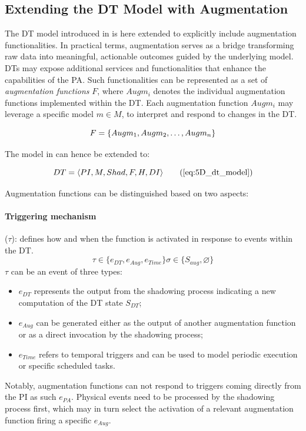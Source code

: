 \subsection{Extending the DT Model with Augmentation}

The \ac{DT} model introduced in  is here extended to explicitly include augmentation functionalities.
%
In practical terms, augmentation serves as a bridge transforming raw data into meaningful, actionable outcomes guided by the underlying model.
\acp{DT} may expose additional services and functionalities that enhance the capabilities of the \ac{PA}.
Such functionalities can be represented as a set of \emph{augmentation functions} $F$, where $Augm_{i}$ denotes the individual augmentation functions implemented within the DT. Each augmentation function $Augm_i$ may leverage a specific model $m \in M$, to interpret and respond to changes in the DT.

\begin{equation}\label{eq:augm_set}
    F = \{Augm_{1}, Augm_{2}, \dots, Augm_{n}\}\\
\end{equation}

The model in  can hence be extended to: 

\begin{equation}
DT = \langle PI, M, Shad, F, H, DI \rangle
\tag{\ref{eq:5D_dt_model}}
\end{equation}

Augmentation functions can be distinguished based on two aspects:


\paragraph{Triggering mechanism} (\( \tau \)): defines how and when the function is activated in response to events within the \ac{DT}.
%
\begin{equation}
\tau \in \{ e_{DT}, e_{Aug}, e_{Time} \}  \sigma \in \{S_{aug}, \varnothing\}
\end{equation}
%
\(\tau\) can be an event of three types:
%
\begin{itemize}
\item \( e_{DT} \) represents the output from the shadowing process indicating a new computation of the \ac{DT} state \( S_{DT} \);
\item \( e_{Aug} \) can be generated either as the output of another augmentation function or as a direct invocation by the shadowing process;
\item \( e_{Time} \) refers to temporal triggers and can be used to model periodic execution or specific scheduled tasks.
\end{itemize}
%
Notably, augmentation functions can not respond to triggers coming directly from the \ac{PI} as such $e_{PA}$.
Physical events need to be processed by the shadowing process first, which may in turn select the activation of a relevant augmentation function firing a specific $e_{Aug}$.



